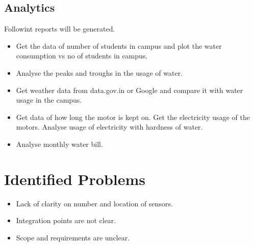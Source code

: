 \documentclass[paper=a4, fontsize=11pt]{scrartcl} %
\numberwithin{equation}{section} %
\numberwithin{figure}{section} %
\numberwithin{table}{section} %
\begin{document}
\subsection{Analytics}
Followint reports will be generated.
\begin{itemize}
\item Get the data of number of students in campus and plot the water consumption vs no of students in campus.
\item Analyse the peaks and troughs in the usage of water.
\item Get weather data from data.gov.in or Google and compare it with water usage in the campus.
\item Get data of how long the motor is kept on. Get the electricity usage of the motors. Analyse usage of electricity with hardness of water.
\item Analyse monthly water bill.
\end{itemize}


\section{Identified Problems}
\begin{itemize}
\item Lack of clarity on number and location of sensors.
\item Integration points are not clear.
\item Scope and requirements are unclear.
\end{itemize}
\end{document}

